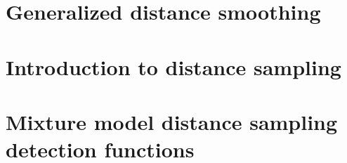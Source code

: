 \documentclass[12pt]{report}
\begin{document}


\chapter{Generalized distance smoothing}
%



\chapter{Introduction to distance sampling}



\chapter{Mixture model distance sampling detection functions}


\end{document}
